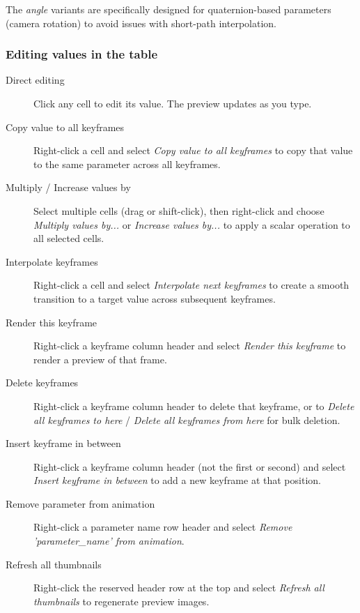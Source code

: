 The \emph{angle} variants are specifically designed for quaternion-based parameters (camera rotation) to avoid issues with short-path interpolation.

\subsubsection{Editing values in the table}

\begin{description}
	\item[Direct editing] Click any cell to edit its value. The preview updates as you type.
	
	\item[Copy value to all keyframes] Right-click a cell and select \emph{Copy value to all keyframes} to copy that value to the same parameter across all keyframes.
	
	\item[Multiply / Increase values by] Select multiple cells (drag or shift-click), then right-click and choose \emph{Multiply values by...} or \emph{Increase values by...} to apply a scalar operation to all selected cells.
	
	\item[Interpolate keyframes] Right-click a cell and select \emph{Interpolate next keyframes} to create a smooth transition to a target value across subsequent keyframes.
	
	\item[Render this keyframe] Right-click a keyframe column header and select \emph{Render this keyframe} to render a preview of that frame.
	
	\item[Delete keyframes] Right-click a keyframe column header to delete that keyframe, or to \emph{Delete all keyframes to here} / \emph{Delete all keyframes from here} for bulk deletion.
	
	\item[Insert keyframe in between] Right-click a keyframe column header (not the first or second) and select \emph{Insert keyframe in between} to add a new keyframe at that position.
	
	\item[Remove parameter from animation] Right-click a parameter name row header and select \emph{Remove 'parameter\_name' from animation}.
	
	\item[Refresh all thumbnails] Right-click the reserved header row at the top and select \emph{Refresh all thumbnails} to regenerate preview images.
\end{description}

